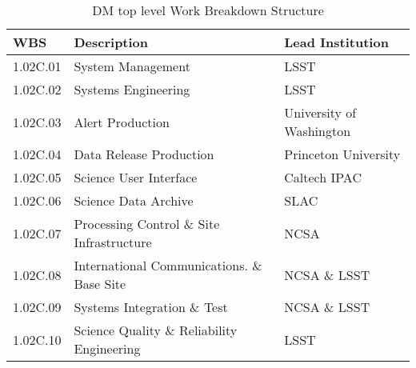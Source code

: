 \begin{table}
\caption{DM top level Work Breakdown Structure \label{tab:wbs}}
\begin{tabular}[htb]{l|l|l}\\ \hline
{\bf WBS}    &  {\bf Description}   &                            {\bf Lead Institution}\\ \hline
	1.02C.01& System Management                       &  LSST\\ \hline
	1.02C.02& Systems Engineering                     &  LSST\\ \hline
	1.02C.03& Alert Production                        &  University of Washington\\ \hline
	1.02C.04& Data Release Production                 &  Princeton University\\ \hline
	1.02C.05& Science User Interface                  &  Caltech IPAC\\ \hline
	1.02C.06& Science Data Archive                    &  SLAC\\ \hline
	1.02C.07& Processing Control \& Site Infrastructure & NCSA\\ \hline
	1.02C.08& International Communications. \& Base Site& NCSA \& LSST\\ \hline
	1.02C.09& Systems Integration \& Test               & NCSA \& LSST\\ \hline
	1.02C.10& Science Quality \& Reliability Engineering& LSST\\ \hline
\end{tabular}
\end{table}

